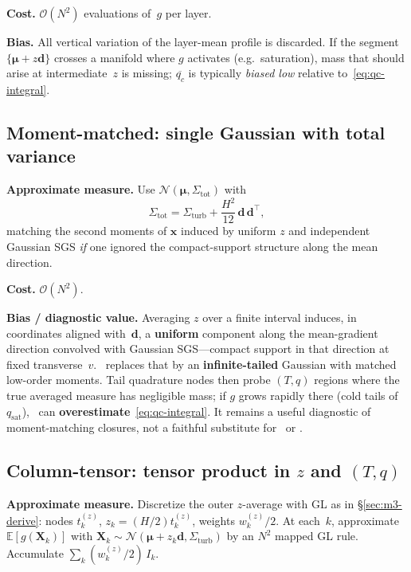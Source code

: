 \documentclass[11pt,a4paper]{article}
\begin{document}
\textbf{Cost.} $\mathcal{O}(N^2)$ evaluations of~$g$ per layer.

\textbf{Bias.}
All vertical variation of the layer-mean profile is discarded.
If the segment $\{\boldsymbol{\mu}+z\mathbf{d}\}$ crosses a manifold where $g$ activates (e.g.\ saturation), mass that should arise at intermediate~$z$ is missing; $\overline{q_c}$ is typically \emph{biased low} relative to~\eqref{eq:qc-integral}.

\subsection{Moment-matched: single Gaussian with total variance}
\textbf{Approximate measure.}
Use $\mathcal{N}(\boldsymbol{\mu},\Sigma_{\mathrm{tot}})$ with
\begin{equation}
  \Sigma_{\mathrm{tot}} = \Sigma_{\mathrm{turb}} + \frac{H^2}{12}\,\mathbf{d}\,\mathbf{d}^\top ,
\end{equation}
matching the second moments of $\mathbf{x}$ induced by uniform $z$ and independent Gaussian SGS \emph{if} one ignored the compact-support structure along the mean direction.

\textbf{Cost.} $\mathcal{O}(N^2)$.

\textbf{Bias / diagnostic value.}
Averaging $z$ over a finite interval induces, in coordinates aligned with~$\mathbf{d}$, a \textbf{uniform} component along the mean-gradient direction convolved with Gaussian SGS---compact support in that direction at fixed transverse~$v$.
\momentmatched\ replaces that by an \textbf{infinite-tailed} Gaussian with matched low-order moments.
Tail quadrature nodes then probe $(T,q)$ regions where the true averaged measure has negligible mass; if $g$ grows rapidly there (cold tails of $q_{\mathrm{sat}}$), \momentmatched\ can \textbf{overestimate}~\eqref{eq:qc-integral}.
It remains a useful diagnostic of moment-matching closures, not a faithful substitute for \columntensor\ or \profileros.

\subsection{\texorpdfstring{Column-tensor: tensor product in $z$ and $(T,q)$}{Column-tensor: tensor product in z and (T,q)}}
\textbf{Approximate measure.}
Discretize the outer $z$-average with GL as in \S\ref{sec:m3-derive}: nodes $t^{(z)}_k$, $z_k=(H/2)t^{(z)}_k$, weights $w^{(z)}_k/2$.
At each~$k$, approximate $\mathbb{E}[g(\mathbf{X}_k)]$ with $\mathbf{X}_k\sim\mathcal{N}(\boldsymbol{\mu}+z_k\mathbf{d},\Sigma_{\mathrm{turb}})$ by an $N^2$ mapped GL rule.
Accumulate $\sum_k (w^{(z)}_k/2)\,I_k$.
\end{document}
